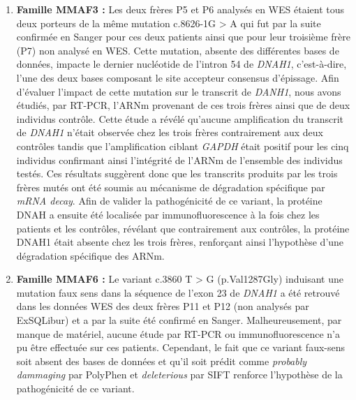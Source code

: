 \documentclass[12pt,a4paper,twoside]{ugathesis}
\theoremstyle{definition}
\theoremstyle{definition}
\theoremstyle{definition}
\theoremstyle{remark}
\begin{document}
\begin{enumerate}
\def\labelenumi{\arabic{enumi}.}
\item
  \textbf{Famille MMAF3 :} Les deux frères P5 et P6 analysés en WES
  étaient tous deux porteurs de la même mutation c.8626-1G
  \textgreater{} A qui fut par la suite confirmée en Sanger pour ces
  deux patients ainsi que pour leur troisième frère (P7) non analysé en
  WES. Cette mutation, absente des différentes bases de données, impacte
  le dernier nucléotide de l'intron 54 de \emph{DNAH1}, c'est-à-dire,
  l'une des deux bases composant le site accepteur consensus d'épissage.
  Afin d'évaluer l'impact de cette mutation sur le transcrit de
  \emph{DANH1}, nous avons étudiés, par RT-PCR, l'ARNm provenant de ces
  trois frères ainsi que de deux individus contrôle. Cette étude a
  révélé qu'aucune amplification du transcrit de \emph{DNAH1} n'était
  observée chez les trois frères contrairement aux deux contrôles tandis
  que l'amplification ciblant \emph{GAPDH} était positif pour les cinq
  individus confirmant ainsi l'intégrité de l'ARNm de l'ensemble des
  individus testés. Ces résultats suggèrent donc que les transcrits
  produits par les trois frères mutés ont été soumis au mécanisme de
  dégradation spécifique par \emph{mRNA decay}. Afin de valider la
  pathogénicité de ce variant, la protéine DNAH a ensuite été localisée
  par immunofluorescence à la fois chez les patients et les contrôles,
  révélant que contrairement aux contrôles, la protéine DNAH1 était
  absente chez les trois frères, renforçant ainsi l'hypothèse d'une
  dégradation spécifique des ARNm.
\item
  \textbf{Famille MMAF6 :} Le variant c.3860 T \textgreater{} G
  (p.Val1287Gly) induisant une mutation faux sens dans la séquence de
  l'exon 23 de \emph{DNAH1} a été retrouvé dans les données WES des deux
  frères P11 et P12 (non analysés par ExSQLibur) et a par la suite été
  confirmé en Sanger. Malheureusement, par manque de matériel, aucune
  étude par RT-PCR ou immunofluorescence n'a pu être effectuée sur ces
  patients. Cependant, le fait que ce variant faux-sens soit absent des
  bases de données et qu'il soit prédit comme \emph{probably dammaging}
  par PolyPhen et \emph{deleterious} par SIFT renforce l'hypothèse de la
  pathogénicité de ce variant.
\end{enumerate}
\end{document}
